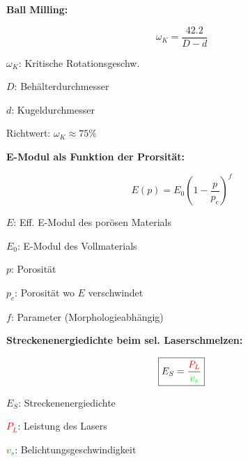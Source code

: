 \textbf{Ball Milling:}\\

\begin{minipage}{0.5\linewidth}
    \[
    \boxed{        
            \omega_{K} = \frac{42.2}{D - d}
    }
    \]
\end{minipage}
\begin{minipage}{0.5\linewidth}
    \item $\omega_{K}$: Kritische Rotationsgeschw.
    \item $D$: Behälterdurchmesser
    \item $d$: Kugeldurchmesser
    \item Richtwert: $\omega_{K} \approx 75 \%$
\end{minipage}
\vspace{1mm}

\textbf{E-Modul als Funktion der Prorsität:}\\

\begin{minipage}{0.5\linewidth}
    \[
    \boxed{        
        E(p) = E_0 \left( 1 - \frac{p}{p_c} \right)^f    }
    \]
\end{minipage}
\begin{minipage}{0.5\linewidth}
    \item $E$: Eff. E-Modul des porösen Materials
    \item $E_0$: E-Modul des Vollmaterials
    \item $p$: Porosität
    \item $p_c$: Porosität wo $E$ verschwindet
    \item $f$: Parameter (Morphologieabhängig)
\end{minipage}
\vspace{1mm}

\textbf{Streckenenergiedichte beim sel. Laserschmelzen:}\\

\begin{minipage}{0.5\linewidth}
    \[
    \boxed{
        E_S = \frac{\textcolor{red}{P_L}}{\textcolor{green}{v_s}}
    }
    \]
\end{minipage}
\begin{minipage}{0.5\linewidth}
    \item $E_S$: Streckenenergiedichte
    \item \textcolor{red}{$P_L$}: Leistung des Lasers
    \item \textcolor{green}{$v_s$}: Belichtungsgeschwindigkeit
\end{minipage}
\vspace{1mm}


